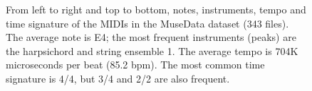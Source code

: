 \documentclass{article}
\begin{document}
\begin{figure}[ht]
    \centering
    \parbox{\linewidth}{
    }
    \parbox{\linewidth}{
}
    \caption{From left to right and top to bottom, notes, instruments, tempo and time signature of the MIDIs in the MuseData dataset (343 files). The average note is E4; the most frequent instruments (peaks) are the harpsichord and string ensemble 1. The average tempo is 704K microseconds per beat (85.2 bpm). The most common time signature is 4/4, but 3/4 and 2/2 are also frequent.}
    \label{fig:stats-musedata}
\end{figure}
\end{document}
